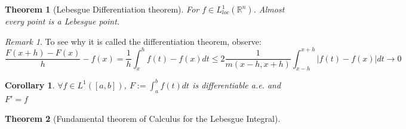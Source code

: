 \documentclass[a4paper,11pt,oneside,fleqn]{book}
\newtheorem{theorem}{Theorem}[section]
\newtheorem{corollary}{Corollary}[theorem]
\theoremstyle{definition}
\theoremstyle{remark}
\newtheorem*{remark}{Remark}
\begin{document}
\begin{theorem}[Lebesgue Differentiation theorem]
	For $f \in L_{loc}^1(\mathbb{R}^n)$. Almost every point is a Lebesgue point.
\end{theorem}
\begin{remark}
To see why it is called the differentiation theorem, observe:
\begin{equation*}
	\frac{F(x + h) - F(x)}{h} - f(x) = \frac{1}{h}\int_x^h f(t) - f(x) dt \leq 2 \frac{1}{m(x-h, x + h)} \int^{x+h}_{x-h} |f(t) - f(x)| dt \rightarrow 0 
\end{equation*}	
\end{remark}


\begin{corollary}
	$\forall f \in L^1([a, b])$, $F := \int_a^b f(t) dt$ is differentiable a.e. and $F' = f$ 
\end{corollary}

\begin{theorem}[Fundamental theorem of Calculus for the Lebesgue Integral]
\end{theorem}
\end{document}
